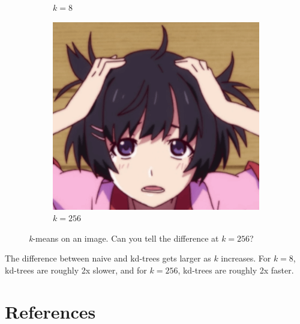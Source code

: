 \documentclass{beamer}                             %
\begin{document}
\begin{frame}
\begin{figure}[h!]
\begin{subfigure}[h]{0.32 \textwidth}
      \caption{\(k = 8 \)}
    \end{subfigure}
    \hfill
    \begin{subfigure}[h]{0.32 \textwidth}
      \includegraphics[scale=0.16]{hanekawa256.png}
      \caption{\( k = 256 \)}
    \end{subfigure}
    \caption{\textit{k}-means on an image. Can you tell the difference
    at \( k = 256 \)?}
\end{figure}
The difference between naive and kd-trees gets larger as \( k \) increases.
For \( k = 8 \), kd-trees are roughly 2x slower, and for \( k = 256 \),
kd-trees are roughly 2x faster.
\end{frame}

\section{References}
\end{document}

